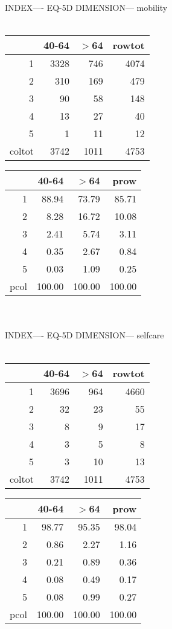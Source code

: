 \documentclass[11pt]{article}
\begin{document}
INDEX---- EQ-5D DIMENSION--- mobility 
 \\\\ 
% 
\begin{tabular}{rrr|r}
  \hline
 & 40-64 & $>$64 & rowtot \\ 
  \hline
1 & 3328 & 746 & 4074 \\ 
  2 & 310 & 169 & 479 \\ 
  3 & 90 & 58 & 148 \\ 
  4 & 13 & 27 & 40 \\ 
  5 & 1 & 11 & 12 \\ 
  coltot & 3742 & 1011 & 4753 \\ 
   \hline
\end{tabular}
% 
\begin{tabular}{rrr|r}
  \hline
 & 40-64 & $>$64 & prow \\ 
  \hline
1 & 88.94 & 73.79 & 85.71 \\ 
  2 & 8.28 & 16.72 & 10.08 \\ 
  3 & 2.41 & 5.74 & 3.11 \\ 
  4 & 0.35 & 2.67 & 0.84 \\ 
  5 & 0.03 & 1.09 & 0.25 \\ 
  pcol & 100.00 & 100.00 & 100.00 \\ 
   \hline
\end{tabular}
\\\\ 
INDEX---- EQ-5D DIMENSION--- selfcare 
 \\\\ 
% 
\begin{tabular}{rrr|r}
  \hline
 & 40-64 & $>$64 & rowtot \\ 
  \hline
1 & 3696 & 964 & 4660 \\ 
  2 & 32 & 23 & 55 \\ 
  3 & 8 & 9 & 17 \\ 
  4 & 3 & 5 & 8 \\ 
  5 & 3 & 10 & 13 \\ 
  coltot & 3742 & 1011 & 4753 \\ 
   \hline
\end{tabular}
% 
\begin{tabular}{rrr|r}
  \hline
 & 40-64 & $>$64 & prow \\ 
  \hline
1 & 98.77 & 95.35 & 98.04 \\ 
  2 & 0.86 & 2.27 & 1.16 \\ 
  3 & 0.21 & 0.89 & 0.36 \\ 
  4 & 0.08 & 0.49 & 0.17 \\ 
  5 & 0.08 & 0.99 & 0.27 \\ 
  pcol & 100.00 & 100.00 & 100.00 \\ 
   \hline
\end{tabular}
\end{document}

